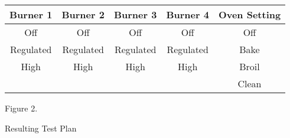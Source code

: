 \documentclass[12pt,letterpaper]{article}
\begin{document}
\begin{center}
	\begin{tabular}{|| c c c c c ||}
	\hline
	Burner 1 & Burner 2 & Burner 3 & Burner 4 & Oven Setting \\
	\hline\hline
	Off & Off & Off & Off & Off \\
	\hline
	Regulated & Regulated & Regulated & Regulated & Bake \\
	\hline
	High & High & High & High & Broil \\
	\hline
	& & & & Clean \\
	\hline
	\end{tabular}
	
	Figure 2.
\end{center}
\begin{center}

Resulting Test Plan



\end{center}
\end{document}
